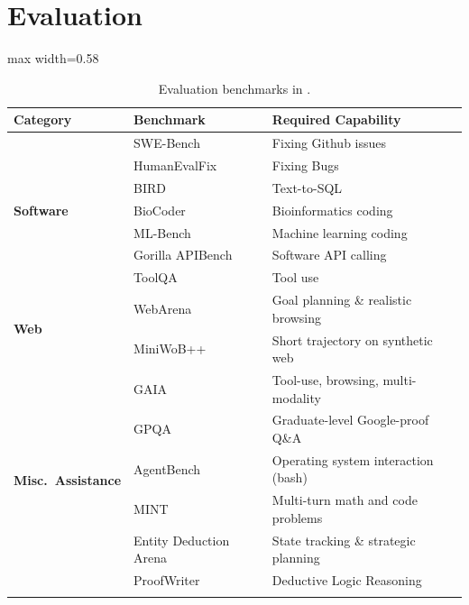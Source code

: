 
\section{Evaluation}
\label{sec:evaluation}

\begin{table}
\vspace{-0.4cm}
\caption{Evaluation benchmarks in \projname.}
\vspace{-0.2cm}
\begin{adjustbox}{max width=0.58\textwidth}
\begin{tabular}{lll}
\toprule
\textbf{Category}
& \textbf{Benchmark}
& \textbf{Required Capability} \\
\midrule
\multirow{7}{*}{\textbf{Software}}
& SWE-Bench \citep{jimenez2024swebench} & Fixing Github issues \\
& HumanEvalFix \citep{muennighoff2024octopack} & Fixing Bugs \\
& BIRD \citep{bird} & Text-to-SQL \\
& BioCoder \citep{tang2023biocoder} & Bioinformatics coding \\
& ML-Bench \citep{liu2024mlbench} & Machine learning coding \\
& Gorilla APIBench \citep{patil2023gorilla} & Software API calling \\
& ToolQA \citep{zhuang2024toolqa} & Tool use \\

\midrule
\multirow{2}{*}{\textbf{Web}}
& WebArena \citep{zhou2023webarena} & Goal planning \& realistic browsing \\
& MiniWoB++ \citep{liu2018reinforcement} & Short trajectory on synthetic web \\

\midrule
\multirow{6}{*}{\textbf{Misc.~Assistance}}
& GAIA \citep{gaia} & Tool-use, browsing, multi-modality \\
& GPQA \citep{rein2023gpqa} & Graduate-level Google-proof Q\&A \\
& AgentBench \citep{liu2023agentbench} & Operating system interaction (bash) \\
& MINT \citep{wang2024mint} & Multi-turn math and code problems \\
& Entity Deduction Arena \citep{zhang2023entity} & State tracking \& strategic planning \\
& ProofWriter \citep{proofwriter} & Deductive Logic Reasoning \\

\bottomrule
\vspace{-20mm}
\end{tabular}
\end{adjustbox}
\label{tab:od-benchmarks}
\end{table}


